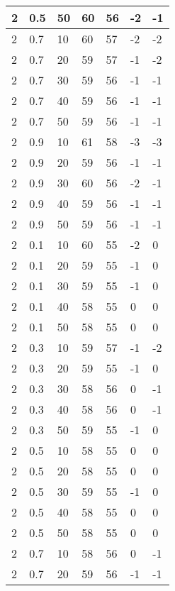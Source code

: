 \begin{longtable}{|l|l|l|l|l|l|l|}
		2     & 0.5 & 50   & 60 & 56 & -2  & -1  \\ \hline
		2     & 0.7 & 10   & 60 & 57 & -2  & -2  \\ \hline
		2     & 0.7 & 20   & 59 & 57 & -1  & -2  \\ \hline
		2     & 0.7 & 30   & 59 & 56 & -1  & -1  \\ \hline
		2     & 0.7 & 40   & 59 & 56 & -1  & -1  \\ \hline
		2     & 0.7 & 50   & 59 & 56 & -1  & -1  \\ \hline
		2     & 0.9 & 10   & 61 & 58 & -3  & -3  \\ \hline
		2     & 0.9 & 20   & 59 & 56 & -1  & -1  \\ \hline
		2     & 0.9 & 30   & 60 & 56 & -2  & -1  \\ \hline
		2     & 0.9 & 40   & 59 & 56 & -1  & -1  \\ \hline
		2     & 0.9 & 50   & 59 & 56 & -1  & -1  \\ \hline
		2     & 0.1 & 10   & 60 & 55 & -2  & 0   \\ \hline
		2     & 0.1 & 20   & 59 & 55 & -1  & 0   \\ \hline
		2     & 0.1 & 30   & 59 & 55 & -1  & 0   \\ \hline
		2     & 0.1 & 40   & 58 & 55 & 0   & 0   \\ \hline
		2     & 0.1 & 50   & 58 & 55 & 0   & 0   \\ \hline
		2     & 0.3 & 10   & 59 & 57 & -1  & -2  \\ \hline
		2     & 0.3 & 20   & 59 & 55 & -1  & 0   \\ \hline
		2     & 0.3 & 30   & 58 & 56 & 0   & -1  \\ \hline
		2     & 0.3 & 40   & 58 & 56 & 0   & -1  \\ \hline
		2     & 0.3 & 50   & 59 & 55 & -1  & 0   \\ \hline
		2     & 0.5 & 10   & 58 & 55 & 0   & 0   \\ \hline
		2     & 0.5 & 20   & 58 & 55 & 0   & 0   \\ \hline
		2     & 0.5 & 30   & 59 & 55 & -1  & 0   \\ \hline
		2     & 0.5 & 40   & 58 & 55 & 0   & 0   \\ \hline
		2     & 0.5 & 50   & 58 & 55 & 0   & 0   \\ \hline
		2     & 0.7 & 10   & 58 & 56 & 0   & -1  \\ \hline
		2     & 0.7 & 20   & 59 & 56 & -1  & -1  \\ \hline

\end{longtable}
